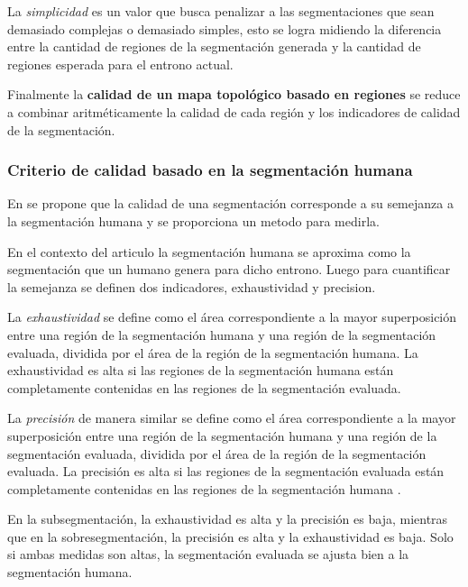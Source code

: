 
La \emph{simplicidad} es un valor que busca penalizar a las segmentaciones que
sean demasiado complejas o demasiado simples, esto se logra midiendo la
diferencia entre la cantidad de regiones de la segmentación generada y la 
cantidad de regiones esperada para el entrono actual.

Finalmente la \textbf{calidad de un mapa topológico basado en regiones} se
reduce a combinar aritméticamente la calidad de cada región y los indicadores
de calidad de la segmentación.


\subsubsection{Criterio de calidad basado en la segmentación humana}
En \cite{bormann2016room} se propone que la calidad de una segmentación
corresponde a su semejanza a la segmentación humana y se proporciona un metodo
para medirla.  

En el contexto del articulo la segmentación humana se aproxima como la
segmentación que un humano genera para dicho entrono. Luego para cuantificar la
semejanza se definen dos indicadores, exhaustividad y precision. 

La \emph{exhaustividad} se define como el área correspondiente a la mayor 
superposición entre una región de la segmentación humana y una región de la
segmentación evaluada, dividida por el área de la región de la segmentación
humana. La exhaustividad es alta si las regiones de la segmentación humana
están completamente contenidas en las regiones de la segmentación evaluada. 

La \emph{precisión} de manera similar se define como el área correspondiente a
la mayor superposición entre una región de la segmentación humana y una región
de la segmentación evaluada, dividida por el área de la región de la
segmentación evaluada. La precisión es alta si las regiones de la segmentación
evaluada están completamente contenidas en las regiones de la segmentación
humana . 

En la subsegmentación, la exhaustividad es alta y la precisión es baja,
mientras que en la sobresegmentación, la precisión es alta y la exhaustividad
es baja.  Solo si ambas medidas son altas, la segmentación evaluada se ajusta
bien a la segmentación humana.  

